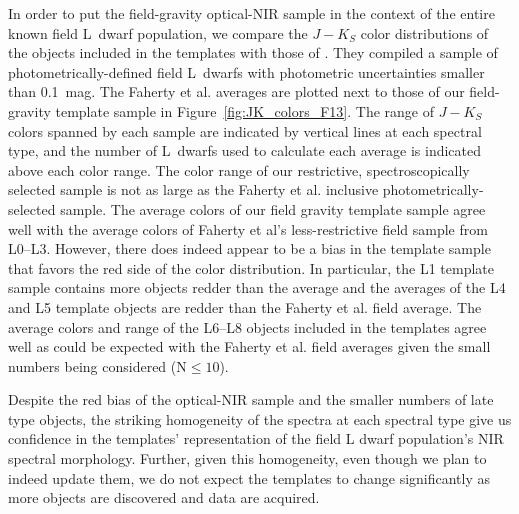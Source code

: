 \documentclass[12pt,preprint]{aastex}
\begin{document}
In order to put the field-gravity optical-NIR sample in the context of the entire known field L~dwarf population, we compare the $J-K_S$ color distributions of the objects included in the templates with those of \citet{Faherty13_0355}. 
They compiled a sample of photometrically-defined field L~dwarfs with photometric uncertainties smaller than 0.1~mag. 
The Faherty et al. averages are plotted next to those of our field-gravity template sample in Figure~\ref{fig:JK_colors_F13}. 
The range of $J-K_S$ colors spanned by each sample are indicated by vertical lines at each spectral type, and the number of L~dwarfs used to calculate each average is indicated above each color range.
The color range of our restrictive, spectroscopically selected sample is not as large as the Faherty et al. inclusive photometrically-selected sample.
The average colors of our field gravity template sample agree well with the average colors of Faherty et al's less-restrictive field sample from L0--L3.
However, there does indeed appear to be a bias in the template sample that favors the red side of the color distribution. 
In particular, the L1 template sample contains more objects redder than the average and the averages of the L4 and L5 template objects are redder than the Faherty et al. field average.
The average colors and range of the L6--L8 objects included in the templates agree well as could be expected with the Faherty et al. field averages given the small numbers being considered (N$\le10$).

Despite the red bias of the optical-NIR sample and the smaller numbers of late type objects, the striking homogeneity of the spectra at each spectral type give us confidence in the templates' representation of the field L dwarf population's NIR spectral morphology.
Further, given this homogeneity, even though we plan to indeed update them, we do not expect the templates to change significantly as more objects are discovered and data are acquired.


\end{document}

